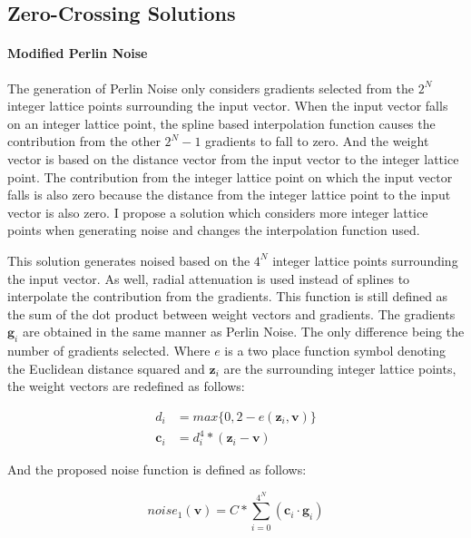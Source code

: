 \documentclass[12pt]{article}
\theoremstyle{definition}
\theoremstyle{remark}
\begin{document}
\subsection{Zero-Crossing Solutions}

\paragraph{Modified Perlin Noise} 

The generation of Perlin Noise only considers gradients selected from the $2^N$ integer lattice points surrounding the input vector. When the input vector falls on an integer lattice point, the spline based interpolation function causes the contribution from the other $2^N-1$ gradients to fall to zero. And the weight vector is based on the distance vector from the input vector to the integer lattice point. The contribution from the integer lattice point on which the input vector falls is also zero because the distance from the integer lattice point to the input vector is also zero. I propose a solution which considers more integer lattice points when generating noise and changes the interpolation function used.

This solution generates noised based on the $4^N$ integer lattice points surrounding the input vector. As well, radial attenuation is used instead of splines to interpolate the contribution from the gradients. This function is still defined as the sum of the dot product between weight vectors and gradients. The gradients $\textbf{g}_i$ are obtained in the same manner as Perlin Noise. The only difference being the number of gradients selected. Where $e$ is a two place function symbol denoting the Euclidean distance squared and $\textbf{z}_i$ are the surrounding integer lattice points, the weight vectors are redefined as follows:

\begin{align*}
d_i &= max\{0, 2 - e(\textbf{z}_i,\textbf{v})\} \\
\textbf{c}_i &= d_i^4 * (\textbf{z}_i - \textbf{v})
\end{align*}

And the proposed noise function is defined as follows:

\begin{equation*}
	noise_1(\textbf{v})=C*\sum_{i=0}^{4^N}(\textbf{c}_i \cdot \textbf{g}_i)
\end{equation*}
\end{document}
